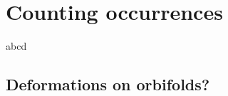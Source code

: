 \chapter{Counting occurrences} \label{Counting_occurrences}
abcd
\section{Deformations on orbifolds?}
